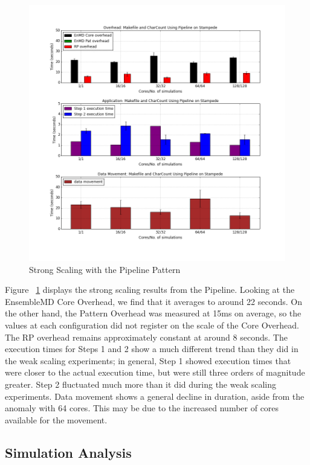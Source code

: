 \documentclass[]{article}
\begin{document}
		\begin{figure}[H]
			\centering
			\includegraphics[scale=.30]{img/pipeline_strong_scaling.png}
			\caption{Strong Scaling with the Pipeline Pattern}
			\label{fig:pipeline_strong_scaling}
		\end{figure}

		Figure ~\ref{fig:pipeline_strong_scaling} displays the strong scaling results from the Pipeline. Looking at the EnsembleMD Core Overhead, we find that it averages to around 22 seconds. On the other hand, the Pattern Overhead was measured at 15ms on average, so the values at each configuration did not register on the scale of the Core Overhead. The RP overhead remains approximately constant at around 8 seconds. The execution times for Steps 1 and 2 show a much different trend than they did in the weak scaling experiments; in general, Step 1 showed execution times that were closer to the actual execution time, but were still three orders of magnitude greater. Step 2 fluctuated much more than it did during the weak scaling experiments.
		Data movement shows a general decline in duration, aside from the anomaly with 64 cores. This may be due to the increased number of cores available for the movement.

	\pagebreak
	\subsection{Simulation Analysis}
\end{document}
